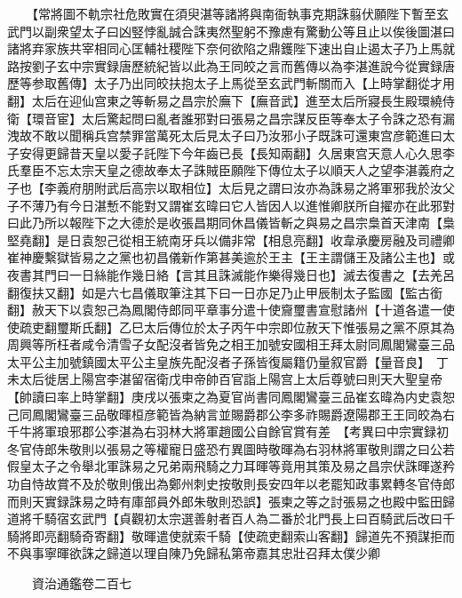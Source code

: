 　　【常將圖不軌宗社危敗實在須臾湛等諸將與南衙執事克期誅翦伏願陛下暫至玄武門以副衆望太子曰凶竪悖亂誠合誅夷然聖躬不豫慮有驚動公等且止以俟後圖湛曰諸將弃家族共宰相同心匡輔社稷陛下奈何欲陷之鼎鑊陛下速出自止遏太子乃上馬就路按劉子玄中宗實録唐歷統紀皆以此為王同皎之言而舊傳以為李湛進說今從實録唐歷等参取舊傳】太子乃出同皎扶抱太子上馬從至玄武門斬關而入【上時掌翻從才用翻】太后在迎仙宫東之等斬易之昌宗於廡下【廡音武】進至太后所寢長生殿環繞侍衛【環音宦】太后驚起問曰亂者誰邪對曰張易之昌宗謀反臣等奉太子令誅之恐有漏洩故不敢以聞稱兵宫禁罪當萬死太后見太子曰乃汝邪小子既誅可還東宫彦範進曰太子安得更歸昔天皇以愛子託陛下今年齒已長【長知兩翻】久居東宫天意人心久思李氏羣臣不忘太宗天皇之德故奉太子誅賊臣願陛下傳位太子以順天人之望李湛義府之子也【李義府朋附武后高宗以取相位】太后見之謂曰汝亦為誅易之將軍邪我於汝父子不薄乃有今日湛慙不能對又謂崔玄暐曰它人皆因人以進惟卿朕所自擢亦在此邪對曰此乃所以報陛下之大德於是收張昌期同休昌儀皆斬之與易之昌宗梟首天津南【梟堅堯翻】是日袁恕己從相王統南牙兵以備非常【相息亮翻】收韋承慶房融及司禮卿崔神慶繫獄皆易之之黨也初昌儀新作第甚美逾於王主【王主謂儲王及諸公主也】或夜書其門曰一日絲能作幾日絡【言其且誅滅能作樂得幾日也】滅去復書之【去羌呂翻復扶又翻】如是六七昌儀取筆注其下曰一日亦足乃止甲辰制太子監國【監古銜翻】赦天下以袁恕己為鳳閣侍郎同平章事分遣十使齎璽書宣慰諸州【十道各遣一使使疏吏翻璽斯氏翻】乙巳太后傳位於太子丙午中宗即位赦天下惟張易之黨不原其為周興等所枉者咸令清雪子女配沒者皆免之相王加號安國相王拜太尉同鳳閣鸞臺三品太平公主加號鎮國太平公主皇族先配沒者子孫皆復屬籍仍量叙官爵【量音良】　丁未太后徙居上陽宫李湛留宿衛戊申帝帥百官詣上陽宫上太后尊號曰則天大聖皇帝【帥讀曰率上時掌翻】庚戌以張柬之為夏官尚書同鳳閣鸞臺三品崔玄暐為内史袁恕己同鳳閣鸞臺三品敬暉桓彦範皆為納言並賜爵郡公李多祚賜爵遼陽郡王王同皎為右千牛將軍琅邪郡公李湛為右羽林大將軍趙國公自餘官賞有差　【考異曰中宗實録初冬官侍郎朱敬則以張易之等權寵日盛恐冇異圖時敬暉為右羽林將軍敬則謂之曰公若假皇太子之令舉北軍誅易之兄弟兩飛騎之力耳暉等竟用其策及易之昌宗伏誅暉遂矜功自恃故賞不及於敬則俄出為鄭州刺史按敬則長安四年以老罷知政事累轉冬官侍郎而則天實録誅易之時有庫部員外郎朱敬則恐誤】張柬之等之討張易之也殿中監田歸道將千騎宿玄武門【貞觀初太宗選善射者百人為二番於北門長上曰百騎武后改曰千騎將即亮翻騎奇寄翻】敬暉遣使就索千騎【使疏吏翻索山客翻】歸道先不預謀拒而不與事寧暉欲誅之歸道以理自陳乃免歸私第帝嘉其忠壯召拜太僕少卿

　　資治通鑑卷二百七  
    


 


 



